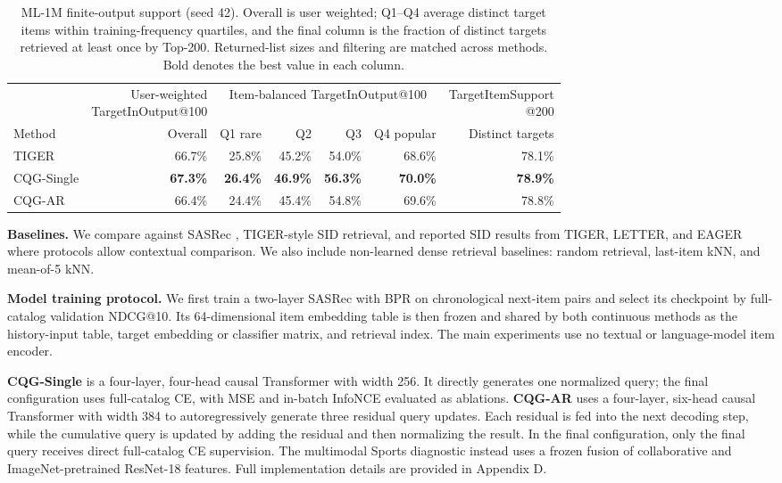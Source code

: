 \documentclass[letterpaper]{article}
\begin{document}
\begin{table}[!t]
\centering
\small
\setlength{\tabcolsep}{4pt}
\renewcommand{\arraystretch}{0.87}
\begin{tabular}{lrrrrrr}
\toprule
& \shortstack{User-weighted\\TargetInOutput@100} &
\multicolumn{4}{c}{Item-balanced TargetInOutput@100} &
\shortstack{TargetItemSupport\\@200} \\
\cmidrule(lr){3-6}
Method & Overall & Q1 rare & Q2 & Q3 & Q4 popular & Distinct targets \\
\midrule
TIGER & 66.7\% & 25.8\% & 45.2\% & 54.0\% & 68.6\% & 78.1\% \\
CQG-Single & \textbf{67.3\%} & \textbf{26.4\%} & \textbf{46.9\%} & \textbf{56.3\%} & \textbf{70.0\%} & \textbf{78.9\%} \\
CQG-AR & 66.4\% & 24.4\% & 45.4\% & 54.8\% & 69.6\% & 78.8\% \\
\bottomrule
\end{tabular}
\caption{ML-1M finite-output support (seed 42). Overall is user weighted;
Q1--Q4 average distinct target items within training-frequency quartiles, and
the final column is the fraction of distinct targets retrieved at least once
by Top-200. Returned-list sizes and filtering are matched across methods.
Bold denotes the best value in each column.}
\label{tab:target-support-comparison}
\end{table}



\textbf{Baselines.} We compare against SASRec \citep{kang2018sasrec}, TIGER-style SID retrieval, and reported SID results from TIGER, LETTER, and EAGER where protocols allow contextual comparison. We also include non-learned dense retrieval baselines: random retrieval, last-item kNN, and mean-of-5 kNN.

\textbf{Model training protocol.}
We first train a two-layer SASRec with BPR on chronological next-item pairs and select its checkpoint by full-catalog validation NDCG@10. Its 64-dimensional item embedding table is then frozen and shared by both continuous methods as the history-input table, target embedding or classifier matrix, and retrieval index. The main experiments use no textual or language-model item encoder.

\textbf{CQG-Single} is a four-layer, four-head causal Transformer with width
256. It directly generates one normalized query; the final configuration uses
full-catalog CE, with MSE and in-batch InfoNCE evaluated as ablations.
\textbf{CQG-AR} uses a four-layer, six-head causal Transformer with width 384
to autoregressively generate three residual query updates. Each residual is
fed into the next decoding step, while the cumulative query is updated by
adding the residual and then normalizing the result. In the final
configuration, only the final query receives direct full-catalog CE
supervision. The multimodal Sports diagnostic instead uses a frozen fusion of
collaborative and ImageNet-pretrained ResNet-18 features. Full implementation
details are provided in Appendix D.
\end{document}

